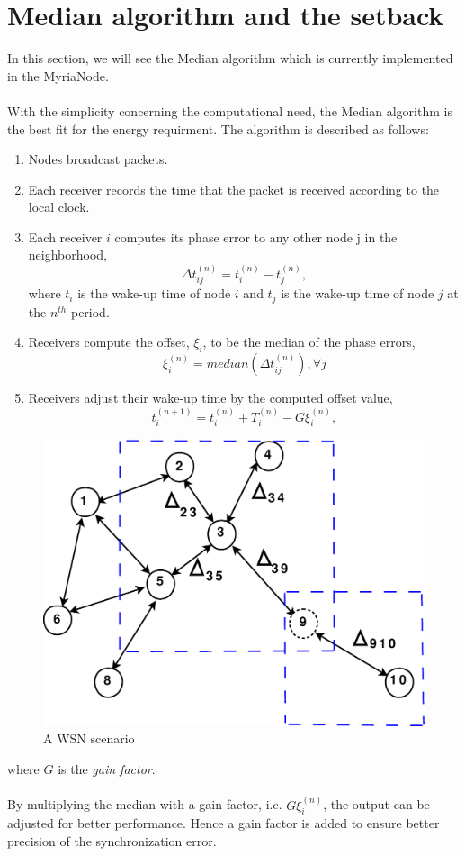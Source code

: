 \documentclass[a4paper,10pt]{report}
\begin{document}
\section{\textbf{Median algorithm and the setback}} In this section, we will see the Median algorithm which is
currently implemented in the MyriaNode. \paragraph*{}
With the simplicity concerning the computational need, the Median algorithm is the best fit for the energy requirment. The algorithm is described as follows:
\begin{enumerate}
\item Nodes broadcast packets.
\item Each receiver records the time that the packet is received according to the local clock.
\item Each receiver $i$ computes its phase error to any other node j in the neighborhood,
\begin{equation}
\Delta t_{ij}^{(n)} = t_i^{(n)} - t_j^{(n)} , \label{pha}
\end{equation}
where $t_i$ is the wake-up time of node $i$ and $t_j$ is the wake-up
time of node $j$ at the $n^{th}$ period.
\item Receivers compute the offset, $\xi_i$, to be the median of the phase errors,
\begin{equation}
\xi_i^{(n)} = median(\Delta t_{ij}^{(n)}) , \forall j
\end{equation}
\item Receivers adjust their wake-up time by the computed offset value,
\begin{equation}
t_{i}^{(n+1)} = t_i^{(n)} + T_i^{(n)} - G\xi_i^{(n)},
\end{equation}
\end{enumerate}
\begin{figure}
\centering
\includegraphics[width=0.4 \textwidth]{node_field}
\caption{A WSN scenario} \label{wsn}
\end{figure}
where $G$ is the \textit{gain factor}. \paragraph*{}
By multiplying the median with a gain factor, i.e. $G\xi_i^{(n)}$, the output can be adjusted for better performance. Hence a gain factor is added to ensure better precision of the synchronization error.
\end{document}
